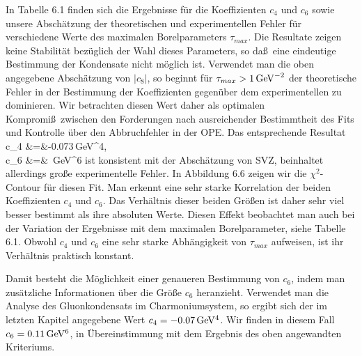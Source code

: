 In Tabelle 6.1 finden sich die Ergebnisse f\"ur die
Koeffizienten $c_4$ und $c_6$ sowie unsere Absch\"atzung der
theoretischen und experimentellen Fehler f\"ur verschiedene
Werte des maximalen Borelparameters $\tau_{max}$. Die Resultate
zeigen keine Stabilit\"at bez\"uglich der Wahl dieses Parameters,
so da\ss\ eine eindeutige Bestimmung der Kondensate nicht m\"oglich
ist. Verwendet man die oben angegebene Absch\"atzung von $|c_8|$,
so beginnt f\"ur
$\tau_{max}>1\,{\rm GeV}^{-2}$ der theoretische Fehler
in der Bestimmung der Koeffizienten gegen\"uber dem experimentellen
zu dominieren. Wir betrachten  diesen Wert daher als optimalen
Kompromi\ss\ zwischen den Forderungen nach ausreichender 
Bestimmtheit des Fits und Kontrolle \"uber den Abbruchfehler
in der OPE. Das entsprechende Resultat
\beq
\label{fitresult}
  c_4 &=&-0.073\,{\rm GeV}^{4}, \\   
  c_6 &=& \,{\rm GeV}^{6}
\eeq
ist konsistent mit der Absch\"atzung von SVZ, beinhaltet allerdings
gro\ss e experimentelle Fehler. In Abbildung 6.6 zeigen wir die
$\chi^2$-Contour f\"ur diesen Fit. Man erkennt eine sehr starke 
Korrelation der beiden Koeffizienten $c_4$ und $c_6$. Das 
Verh\"altnis dieser beiden Gr\"o\ss en ist daher sehr viel besser
bestimmt als ihre absoluten Werte.   Diesen Effekt beobachtet
man auch bei der Variation der Ergebnisse mit dem maximalen 
Borelparameter, siehe Tabelle 6.1. Obwohl $c_4$ und $c_6$ eine
sehr starke Abh\"angigkeit von $\tau_{max}$ aufweisen, ist ihr 
Verh\"altnis praktisch konstant. 

Damit besteht die M\"oglichkeit einer genaueren Bestimmung 
von $c_6$, indem man zus\"atzliche Informationen \"uber 
die Gr\"o\ss e $c_6$ heranzieht. Verwendet man die Analyse
des Gluonkondensats im Charmoniumsystem, so ergibt sich der
im letzten Kapitel angegebene Wert $c_4=-0.07\,\rm GeV^4$. Wir
finden in diesem Fall $c_6=0.11\,\rm GeV^6$, in \"Ubereinstimmung
mit dem Ergebnis des oben angewandten Kriteriums. 

